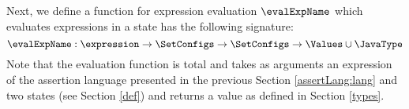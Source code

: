 
 



Next, we define a function for expression evaluation
 $\evalExpName$ which evaluates expressions in a state has the following signature:
$$
\evalExpName : \expression \rightarrow \SetConfigs  \rightarrow \SetConfigs  \rightarrow  \Values \cup \JavaType
$$
Note that the evaluation function is total and  takes as arguments an expression of the assertion language presented in the previous Section 
\ref{assertLang:lang} and two states (see Section \ref{def})  and returns a value as defined in Section \ref{types}.








